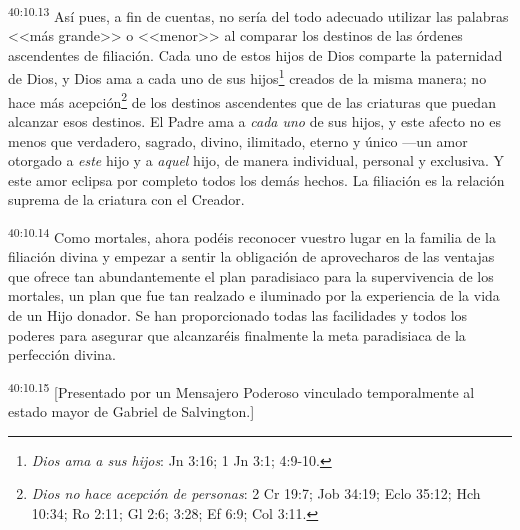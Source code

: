\par
\textsuperscript{40:10.13} Así pues, a fin de cuentas, no sería del todo adecuado utilizar las palabras <<más grande>> o <<menor>> al comparar los destinos de las órdenes ascendentes de filiación. Cada uno de estos hijos de Dios comparte la paternidad de Dios, y Dios ama a cada uno de sus hijos\footnote{\textit{Dios ama a sus hijos}: Jn 3:16; 1 Jn 3:1; 4:9-10.} creados de la misma manera; no hace más acepción\footnote{\textit{Dios no hace acepción de personas}: 2 Cr 19:7; Job 34:19; Eclo 35:12; Hch 10:34; Ro 2:11; Gl 2:6; 3:28; Ef 6:9; Col 3:11.} de los destinos ascendentes que de las criaturas que puedan alcanzar esos destinos. El Padre ama a \textit{cada uno} de sus hijos, y este afecto no es menos que verdadero, sagrado, divino, ilimitado, eterno y único ---un amor otorgado a \textit{este} hijo y a \textit{aquel} hijo, de manera individual, personal y exclusiva. Y este amor eclipsa por completo todos los demás hechos. La filiación es la relación suprema de la criatura con el Creador.

\par
\textsuperscript{40:10.14} Como mortales, ahora podéis reconocer vuestro lugar en la familia de la filiación divina y empezar a sentir la obligación de aprovecharos de las ventajas que ofrece tan abundantemente el plan paradisiaco para la supervivencia de los mortales, un plan que fue tan realzado e iluminado por la experiencia de la vida de un Hijo donador. Se han proporcionado todas las facilidades y todos los poderes para asegurar que alcanzaréis finalmente la meta paradisiaca de la perfección divina.

\par
\textsuperscript{40:10.15} [Presentado por un Mensajero Poderoso vinculado temporalmente al estado mayor de Gabriel de Salvington.]